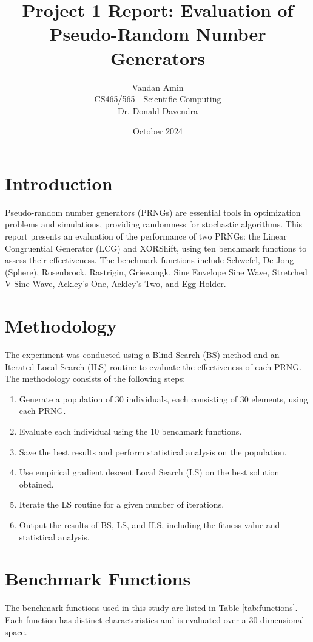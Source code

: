 \documentclass{article}
\title{Project 1 Report: Evaluation of Pseudo-Random Number Generators}
\author{Vandan Amin \\ CS465/565 - Scientific Computing \\ Dr. Donald Davendra}
\date{October 2024}
\begin{document}
\maketitle

\section{Introduction}
Pseudo-random number generators (PRNGs) are essential tools in optimization problems and simulations, providing randomness for stochastic algorithms. This report presents an evaluation of the performance of two PRNGs: the Linear Congruential Generator (LCG) and XORShift, using ten benchmark functions to assess their effectiveness. The benchmark functions include Schwefel, De Jong (Sphere), Rosenbrock, Rastrigin, Griewangk, Sine Envelope Sine Wave, Stretched V Sine Wave, Ackley's One, Ackley's Two, and Egg Holder.

\section{Methodology}
The experiment was conducted using a Blind Search (BS) method and an Iterated Local Search (ILS) routine to evaluate the effectiveness of each PRNG. The methodology consists of the following steps:
\begin{enumerate}
    \item Generate a population of 30 individuals, each consisting of 30 elements, using each PRNG.
    \item Evaluate each individual using the 10 benchmark functions.
    \item Save the best results and perform statistical analysis on the population.
    \item Use empirical gradient descent Local Search (LS) on the best solution obtained.
    \item Iterate the LS routine for a given number of iterations.
    \item Output the results of BS, LS, and ILS, including the fitness value and statistical analysis.
\end{enumerate}

\section{Benchmark Functions}
The benchmark functions used in this study are listed in Table \ref{tab:functions}. Each function has distinct characteristics and is evaluated over a 30-dimensional space.
\end{document}
